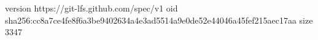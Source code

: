 version https://git-lfs.github.com/spec/v1
oid sha256:cc8a7ce4fe8f6a3be9402634a4e3ad5514a9e0de52e44046a45fef215aec17aa
size 3347
